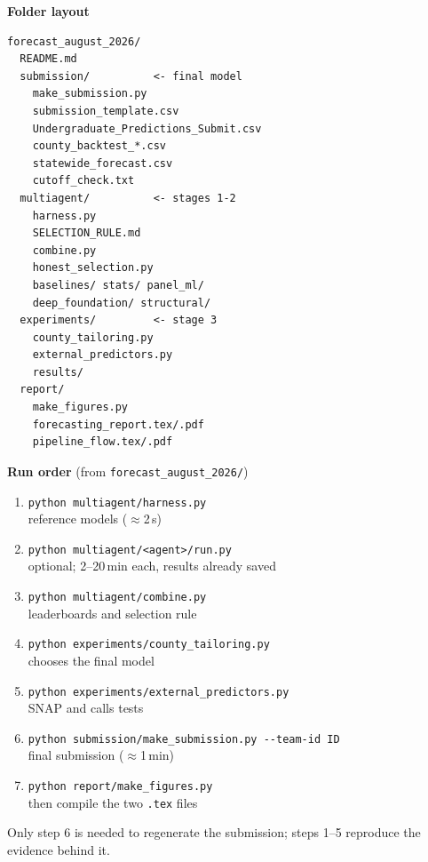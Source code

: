 \documentclass[11pt,letterpaper]{article}
\begin{document}
\begin{minipage}[t]{0.47\textwidth}\small
\textbf{Folder layout}
\begin{verbatim}
forecast_august_2026/
  README.md
  submission/          <- final model
    make_submission.py
    submission_template.csv
    Undergraduate_Predictions_Submit.csv
    county_backtest_*.csv
    statewide_forecast.csv
    cutoff_check.txt
  multiagent/          <- stages 1-2
    harness.py
    SELECTION_RULE.md
    combine.py
    honest_selection.py
    baselines/ stats/ panel_ml/
    deep_foundation/ structural/
  experiments/         <- stage 3
    county_tailoring.py
    external_predictors.py
    results/
  report/
    make_figures.py
    forecasting_report.tex/.pdf
    pipeline_flow.tex/.pdf
\end{verbatim}
\end{minipage}\hfill
\begin{minipage}[t]{0.5\textwidth}\small
\textbf{Run order} (from \texttt{forecast\_august\_2026/})
\begin{enumerate}[leftmargin=1.5em]
  \item \texttt{python multiagent/harness.py}\\ reference models ($\approx$2\,s)
  \item \texttt{python multiagent/<agent>/run.py}\\ optional; 2--20\,min each, results already saved
  \item \texttt{python multiagent/combine.py}\\ leaderboards and selection rule
  \item \texttt{python experiments/county\_tailoring.py}\\ chooses the final model
  \item \texttt{python experiments/external\_predictors.py}\\ SNAP and calls tests
  \item \texttt{python submission/make\_submission.py -{}-team-id ID}\\ final submission ($\approx$1\,min)
  \item \texttt{python report/make\_figures.py}\\ then compile the two \texttt{.tex} files
\end{enumerate}
\medskip
Only step 6 is needed to regenerate the submission; steps 1--5 reproduce the evidence behind it.
\end{minipage}
\end{document}
